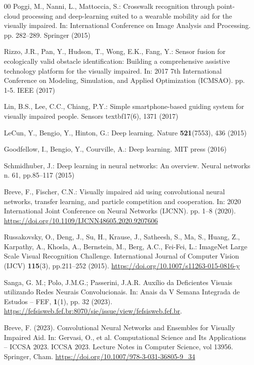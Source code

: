 \documentclass[preprint,12pt]{elsarticle}
\begin{document}
\begin{thebibliography}{00}
Poggi, M., Nanni, L., Mattoccia, S.: Crosswalk recognition through point-cloud processing and deep-learning suited to a wearable mobility aid for the visually impaired. In: International Conference on Image Analysis and Processing. pp. 282--289. Springer (2015)

Rizzo, J.R., Pan, Y., Hudson, T., Wong, E.K., Fang, Y.: Sensor fusion for ecologically valid obstacle identification: Building a comprehensive assistive technology platform for the visually impaired. In: 2017 7th International Conference on Modeling, Simulation, and Applied Optimization (ICMSAO). pp. 1-5. IEEE (2017)

Lin, B.S., Lee, C.C., Chiang, P.Y.: Simple smartphone-based guiding system for visually impaired people. Sensors textbf{17}(6), 1371 (2017)

LeCun, Y., Bengio, Y., Hinton, G.: Deep learning. Nature \textbf{521}(7553), 436 (2015)

Goodfellow, I., Bengio, Y., Courville, A.: Deep learning. MIT press (2016)

Schmidhuber, J.: Deep learning in neural networks: An overview. Neural networks n. 61, pp.85--117 (2015)

Breve, F., Fischer, C.N.: Visually impaired aid using convolutional neural networks, transfer learning, and particle competition and cooperation. In: 2020 International Joint Conference on Neural Networks (IJCNN). pp. 1--8 (2020). \url{https://doi.org/10.1109/IJCNN48605.2020.9207606}

Russakovsky, O., Deng, J., Su, H., Krause, J., Satheesh, S., Ma, S., Huang, Z., Karpathy, A., Khosla, A., Bernstein, M., Berg, A.C., Fei-Fei, L.: ImageNet Large Scale Visual Recognition Challenge. International Journal of Computer Vision (IJCV) \textbf{115}(3), pp.211--252 (2015). \url{https://doi.org/10.1007/s11263-015-0816-y}

Sanga, G. M.; Polo, J.M.G.; Passerini, J.A.R. Auxílio da Deficientes Visuais utilizando Redes Neurais Convolucionais. In: Anais da V Semana Integrada de Estudos – FEF, \textbf{1}(1), pp. 32 (2023). \url{https://fefsisweb.fef.br:8070/sie/issue/view/fefsisweb.fef.br}.

Breve, F. (2023). Convolutional Neural Networks and Ensembles for Visually Impaired Aid. In: Gervasi, O., et al. Computational Science and Its Applications – ICCSA 2023. ICCSA 2023. Lecture Notes in Computer Science, vol 13956. Springer, Cham. \url{https://doi.org/10.1007/978-3-031-36805-9\_34}


\end{thebibliography}
\end{document}
